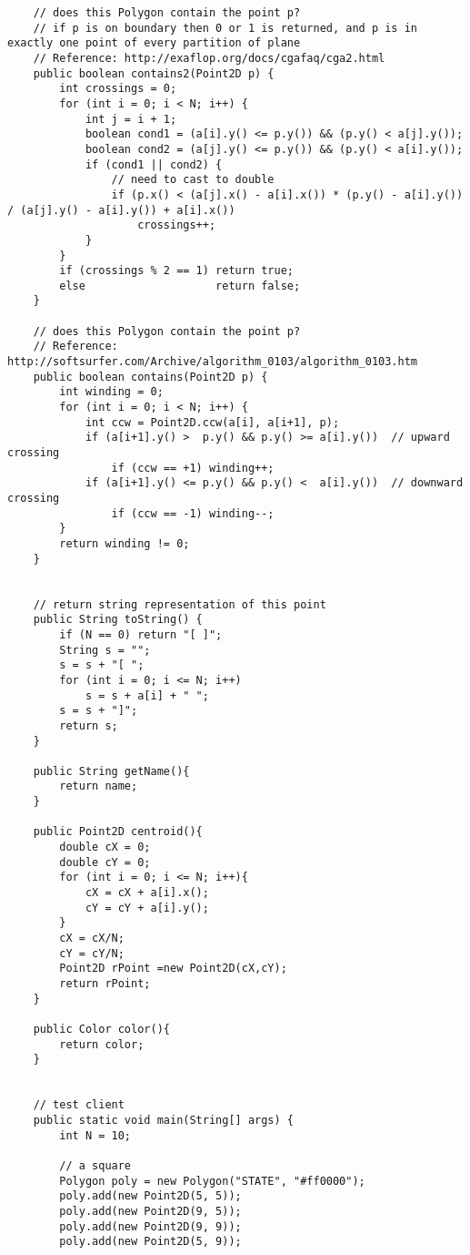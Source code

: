 \begin{verbatim}
    // does this Polygon contain the point p?
    // if p is on boundary then 0 or 1 is returned, and p is in exactly one point of every partition of plane
    // Reference: http://exaflop.org/docs/cgafaq/cga2.html
    public boolean contains2(Point2D p) {
        int crossings = 0;
        for (int i = 0; i < N; i++) {
            int j = i + 1;
            boolean cond1 = (a[i].y() <= p.y()) && (p.y() < a[j].y());
            boolean cond2 = (a[j].y() <= p.y()) && (p.y() < a[i].y());
            if (cond1 || cond2) {
                // need to cast to double
                if (p.x() < (a[j].x() - a[i].x()) * (p.y() - a[i].y()) / (a[j].y() - a[i].y()) + a[i].x())
                    crossings++;
            }
        }
        if (crossings % 2 == 1) return true;
        else                    return false;
    }

    // does this Polygon contain the point p?
    // Reference: http://softsurfer.com/Archive/algorithm_0103/algorithm_0103.htm
    public boolean contains(Point2D p) {
        int winding = 0;
        for (int i = 0; i < N; i++) {
            int ccw = Point2D.ccw(a[i], a[i+1], p);
            if (a[i+1].y() >  p.y() && p.y() >= a[i].y())  // upward crossing
                if (ccw == +1) winding++;
            if (a[i+1].y() <= p.y() && p.y() <  a[i].y())  // downward crossing
                if (ccw == -1) winding--;
        }
        return winding != 0;
    }


    // return string representation of this point
    public String toString() {
        if (N == 0) return "[ ]";
        String s = "";
        s = s + "[ ";
        for (int i = 0; i <= N; i++)
            s = s + a[i] + " ";
        s = s + "]";
        return s;
    }

    public String getName(){
        return name;
    }

    public Point2D centroid(){
        double cX = 0;
        double cY = 0;
        for (int i = 0; i <= N; i++){
            cX = cX + a[i].x();
            cY = cY + a[i].y();
        }
        cX = cX/N;
        cY = cY/N;
        Point2D rPoint =new Point2D(cX,cY);
        return rPoint;
    }

    public Color color(){
        return color;
    }


    // test client
    public static void main(String[] args) {
        int N = 10;

        // a square
        Polygon poly = new Polygon("STATE", "#ff0000");
        poly.add(new Point2D(5, 5));
        poly.add(new Point2D(9, 5));
        poly.add(new Point2D(9, 9));
        poly.add(new Point2D(5, 9));


\end{verbatim}
